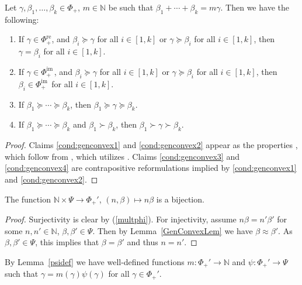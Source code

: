 \documentclass[Unicode,ALCO]{cedram}
\newcommand{\im}{\operatorname{im}}
\newcommand{\0}{{\bar 0}}
\newcommand{\NN}{{\mathbb N}}
\def\re{{\mathrm{re}}}
\def\im{{\mathrm{im}\,}}
\begin{document}
\begin{lemma} \label{GenConvexLem} \cite{KlCuspSys, BaKaTiAffMir}
Let \(\gamma, \beta_1, \ldots, \beta_k \in \Phi_+\), \(m \in \NN\) be such that \(\beta_1 + \cdots + \beta_k = m \gamma\). Then we have the following:
\begin{enumerate}
\item If \(\gamma \in \Phi_+^\re\), and \(\beta_i \succeq \gamma\) for all \(i \in [1,k]\) or \(\gamma \succeq \beta_i\) for all \(i \in [1,k]\), then \(\gamma = \beta_i\) for all \(i \in [1,k]\). \label{cond:genconvex1}
\item If \(\gamma \in \Phi_+^\im\), and \(\beta_i \succeq \gamma\) for all \(i \in [1,k]\) or \(\gamma \succeq \beta_i\) for all \(i \in [1,k]\), then \(\beta_i \in \Phi_+^\im\) for all \(i \in [1,k]\). \label{cond:genconvex2}
\item If \(\beta_1 \succeq \cdots \succeq \beta_k\), then \(\beta_1 \succeq \gamma \succeq \beta_k\). \label{cond:genconvex3}
\item If \(\beta_1 \succeq \cdots \succeq \beta_k\) and \(\beta_1 \succ \beta_k\), then \(\beta_1 \succ \gamma \succ \beta_k\). \label{cond:genconvex4}
\end{enumerate}
\end{lemma}
\begin{proof}
Claims \eqref{cond:genconvex1} and \eqref{cond:genconvex2} appear as the properties \cite[(Con1), (Con3)]{KlCuspSys}, which follow from \cite[Lemma 3.1]{KlCuspSys}, which utilizes \cite[Lemma 2.9]{BaKaTiAffMir}. Claims \eqref{cond:genconvex3} and \eqref{cond:genconvex4} are contrapositive reformulations implied by \eqref{cond:genconvex1} and \eqref{cond:genconvex2}.
\end{proof}


\begin{lemma} \label{psidef} 
The function \(\NN \times \Psi \to \Phi_+'\), \((n, \beta) \mapsto n \beta\) is a bijection.
\end{lemma}
\begin{proof}
Surjectivity is clear by (\ref{multphi}). For injectivity, assume \(n \beta = n' \beta'\) for some \(n,n' \in \NN\), \(\beta,\beta' \in \Psi\). Then by Lemma~\ref{GenConvexLem} we have \(\beta \approx \beta'\). As \(\beta, \beta' \in \Psi\), this implies that \(\beta = \beta'\) and thus \(n = n'\).
\end{proof}

By Lemma~\ref{psidef} we have well-defined functions \(m:\Phi_+' \to \NN\) and \(\psi: \Phi_+' \to \Psi\) such that \(\gamma = m(\gamma) \psi(\gamma)\) for all \(\gamma \in \Phi_+'\).
\end{document}
